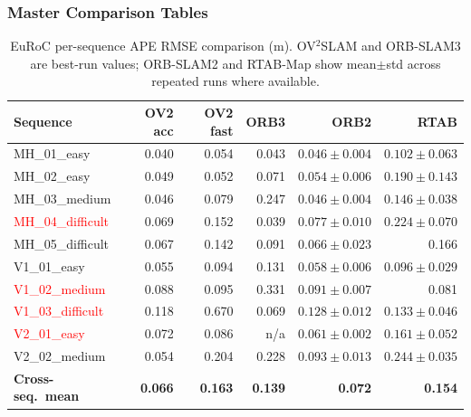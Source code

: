 \documentclass[11pt]{article}
\begin{document}
\subsubsection{Master Comparison Tables}

\begin{table}[H]
\centering
\scriptsize
\setlength{\tabcolsep}{5pt}
\caption{EuRoC per-sequence APE RMSE comparison (m). OV$^2$SLAM and ORB-SLAM3 are best-run values; ORB-SLAM2 and RTAB-Map show mean$\pm$std across repeated runs where available.}
\label{tab:master_comparison_rmse}
\begin{tabular}{lrrrrr}
\toprule
Sequence & OV2 acc & OV2 fast & ORB3 & ORB2 & RTAB \\
\midrule
MH\_01\_easy & 0.040 & 0.054 & 0.043 & $0.046 \pm 0.004$ & $0.102 \pm 0.063$ \\
MH\_02\_easy & 0.049 & 0.052 & 0.071 & $0.054 \pm 0.006$ & $0.190 \pm 0.143$ \\
MH\_03\_medium & 0.046 & 0.079 & 0.247 & $0.046 \pm 0.004$ & $0.146 \pm 0.038$ \\
\textcolor{red}{MH\_04\_difficult} & 0.069 & 0.152 & 0.039 & $0.077 \pm 0.010$ & $0.224 \pm 0.070$ \\
MH\_05\_difficult & 0.067 & 0.142 & 0.091 & $0.066 \pm 0.023$ & 0.166 \\
V1\_01\_easy & 0.055 & 0.094 & 0.131 & $0.058 \pm 0.006$ & $0.096 \pm 0.029$ \\
\textcolor{red}{V1\_02\_medium} & 0.088 & 0.095 & 0.331 & $0.091 \pm 0.007$ & 0.081 \\
\textcolor{red}{V1\_03\_difficult} & 0.118 & 0.670 & 0.069 & $0.128 \pm 0.012$ & $0.133 \pm 0.046$ \\
\textcolor{red}{V2\_01\_easy} & 0.072 & 0.086 & n/a & $0.061 \pm 0.002$ & $0.161 \pm 0.052$ \\
V2\_02\_medium & 0.054 & 0.204 & 0.228 & $0.093 \pm 0.013$ & $0.244 \pm 0.035$ \\
\midrule
\textbf{Cross-seq.\ mean} & \textbf{0.066} & \textbf{0.163} & \textbf{0.139} & \textbf{0.072} & \textbf{0.154} \\
\bottomrule
\end{tabular}
\end{table}
\end{document}
